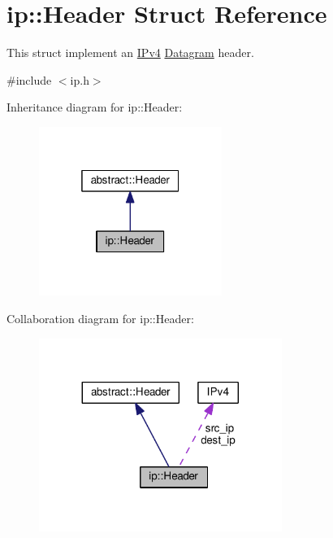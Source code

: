 \hypertarget{structip_1_1Header}{}\section{ip\+:\+:Header Struct Reference}
\label{structip_1_1Header}


This struct implement an \hyperlink{structIPv4}{I\+Pv4} \hyperlink{structip_1_1Datagram}{Datagram} header.  




{\ttfamily \#include $<$ip.\+h$>$}



Inheritance diagram for ip\+:\+:Header\+:\nopagebreak
\begin{figure}[H]
\begin{center}
\leavevmode
\includegraphics[width=169pt]{structip_1_1Header__inherit__graph}
\end{center}
\end{figure}


Collaboration diagram for ip\+:\+:Header\+:\nopagebreak
\begin{figure}[H]
\begin{center}
\leavevmode
\includegraphics[width=224pt]{structip_1_1Header__coll__graph}
\end{center}
\end{figure}
